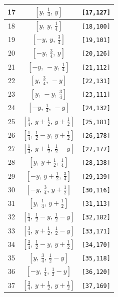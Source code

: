 \documentclass[fleqn,8pt]{jsarticle}
\begin{document}
\begin{longtable}{ccc}
17 & $\left[ y,\, \frac{1}{4},\, y \right]$ & {\tt [17,127]} \\ \hline
18 & $\left[ y,\, y,\, \frac{1}{4} \right]$ & {\tt [18,100]} \\ \hline
19 & $\left[ - y,\, y,\, \frac{3}{4} \right]$ & {\tt [19,101]} \\ \hline
20 & $\left[ - y,\, \frac{3}{4},\, y \right]$ & {\tt [20,126]} \\ \hline
21 & $\left[ - y,\, - y,\, \frac{1}{4} \right]$ & {\tt [21,112]} \\ \hline
22 & $\left[ y,\, \frac{3}{4},\, - y \right]$ & {\tt [22,131]} \\ \hline
23 & $\left[ y,\, - y,\, \frac{3}{4} \right]$ & {\tt [23,111]} \\ \hline
24 & $\left[ - y,\, \frac{1}{4},\, - y \right]$ & {\tt [24,132]} \\ \hline
25 & $\left[ \frac{1}{4},\, y + \frac{1}{2},\, y + \frac{1}{2} \right]$ & {\tt [25,181]} \\ \hline
26 & $\left[ \frac{1}{4},\, \frac{1}{2} - y,\, y + \frac{1}{2} \right]$ & {\tt [26,178]} \\ \hline
27 & $\left[ \frac{1}{4},\, y + \frac{1}{2},\, \frac{1}{2} - y \right]$ & {\tt [27,177]} \\ \hline
28 & $\left[ y,\, y + \frac{1}{2},\, \frac{1}{4} \right]$ & {\tt [28,138]} \\ \hline
29 & $\left[ - y,\, y + \frac{1}{2},\, \frac{3}{4} \right]$ & {\tt [29,139]} \\ \hline
30 & $\left[ - y,\, \frac{3}{4},\, y + \frac{1}{2} \right]$ & {\tt [30,116]} \\ \hline
31 & $\left[ y,\, \frac{1}{4},\, y + \frac{1}{2} \right]$ & {\tt [31,113]} \\ \hline
32 & $\left[ \frac{1}{4},\, \frac{1}{2} - y,\, \frac{1}{2} - y \right]$ & {\tt [32,182]} \\ \hline
33 & $\left[ \frac{3}{4},\, y + \frac{1}{2},\, \frac{1}{2} - y \right]$ & {\tt [33,171]} \\ \hline
34 & $\left[ \frac{3}{4},\, \frac{1}{2} - y,\, y + \frac{1}{2} \right]$ & {\tt [34,170]} \\ \hline
35 & $\left[ y,\, \frac{3}{4},\, \frac{1}{2} - y \right]$ & {\tt [35,118]} \\ \hline
36 & $\left[ - y,\, \frac{1}{4},\, \frac{1}{2} - y \right]$ & {\tt [36,120]} \\ \hline
37 & $\left[ \frac{3}{4},\, y + \frac{1}{2},\, y + \frac{1}{2} \right]$ & {\tt [37,169]} \\ \hline

\end{longtable}
\end{document}
